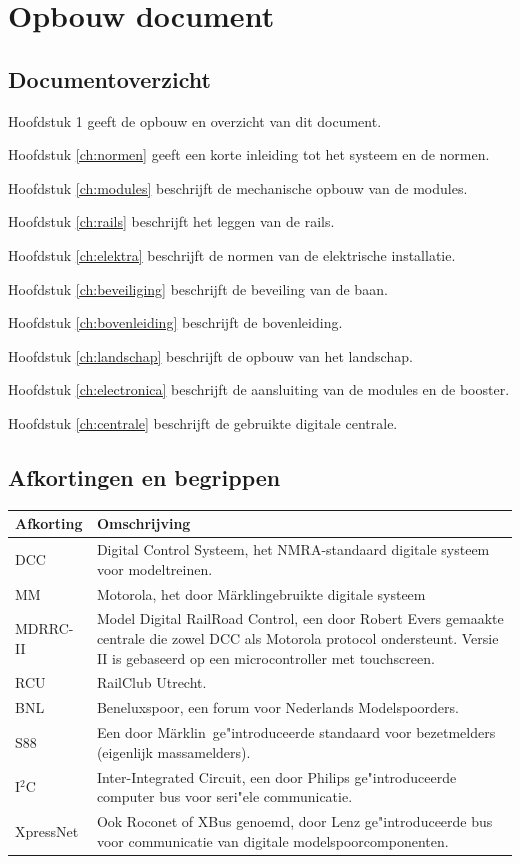 \documentclass[12pt,a4paper]{report}
\newcommand*{\marklin}{M\"{a}rklin}
\newcommand*{\isqc}{I$^{2}$C}
\begin{document}
\chapter{Opbouw document}

\section{Documentoverzicht}

Hoofdstuk 1 geeft de opbouw en overzicht van dit document.

Hoofdstuk \ref{ch:normen} geeft een korte inleiding tot het systeem en de normen.

Hoofdstuk \ref{ch:modules} beschrijft de mechanische opbouw van de modules.

Hoofdstuk \ref{ch:rails} beschrijft het leggen van de rails.

Hoofdstuk \ref{ch:elektra} beschrijft de normen van de elektrische installatie.

Hoofdstuk \ref{ch:beveiliging} beschrijft de beveiling van de baan.

Hoofdstuk \ref{ch:bovenleiding} beschrijft de bovenleiding.

Hoofdstuk \ref{ch:landschap} beschrijft de opbouw van het landschap.

Hoofdstuk \ref{ch:electronica} beschrijft de aansluiting van de modules en de booster.

Hoofdstuk \ref{ch:centrale} beschrijft de gebruikte digitale centrale.

\section{Afkortingen en begrippen}
\begin{tabular}{| l |p{13cm}|}
\hline
\rowcolor[gray]{0.84}Afkorting & Omschrijving\\
\hline
DCC & Digital Control Systeem, het NMRA-standaard digitale systeem voor modeltreinen.\\
\hline
MM & Motorola, het door \marklin gebruikte digitale systeem\\
\hline
MDRRC-II&Model Digital RailRoad Control, een door Robert Evers gemaakte centrale die zowel DCC als Motorola protocol ondersteunt. Versie II is gebaseerd op een microcontroller met touchscreen.\\
\hline
RCU&RailClub Utrecht.\\
\hline
BNL&Beneluxspoor, een forum voor Nederlands Modelspoorders.\\
\hline
S88&Een door \marklin \ ge"{i}ntroduceerde standaard voor bezetmelders (eigenlijk massamelders).\\
\hline
\isqc &Inter-Integrated Circuit, een door Philips ge"{i}ntroduceerde computer bus voor seri"{e}le communicatie.\\
\hline
XpressNet&Ook Roconet of XBus genoemd, door Lenz ge"{i}ntroduceerde bus voor communicatie van digitale modelspoorcomponenten.\\
\hline
\end{tabular}
\end{document}
